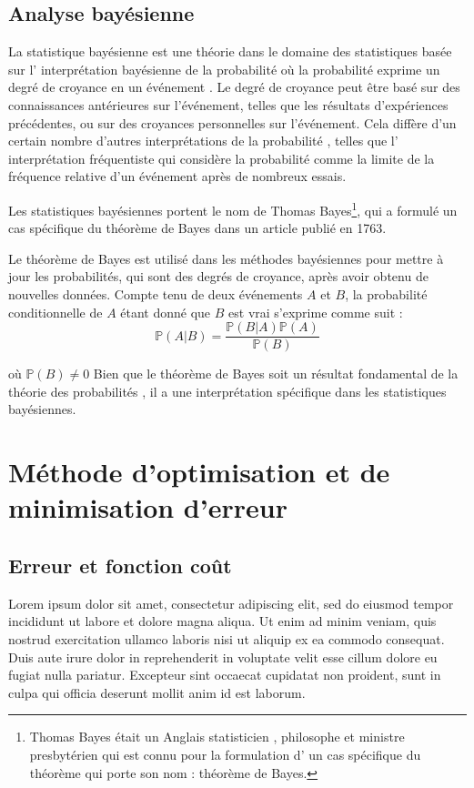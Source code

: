 	\subsection{Analyse bayésienne}
		La statistique bayésienne est une théorie dans le domaine des statistiques basée sur l' interprétation bayésienne de la probabilité où la probabilité exprime un degré de croyance en un événement . Le degré de croyance peut être basé sur des connaissances antérieures sur l'événement, telles que les résultats d'expériences précédentes, ou sur des croyances personnelles sur l'événement. Cela diffère d'un certain nombre d'autres interprétations de la probabilité , telles que l' interprétation fréquentiste qui considère la probabilité comme la limite de la fréquence relative d'un événement après de nombreux essais.
		
		Les statistiques bayésiennes portent le nom de Thomas Bayes\footnote{Thomas Bayes était un Anglais statisticien , philosophe et ministre presbytérien qui est connu pour la formulation d' un cas spécifique du théorème qui porte son nom : théorème de Bayes.}, qui a formulé un cas spécifique du théorème de Bayes dans un article publié en 1763.
		
		
		
		\begin{thm} Le théorème de Bayes est utilisé dans les méthodes bayésiennes pour mettre à jour les probabilités, qui sont des degrés de croyance, après avoir obtenu de nouvelles données. Compte tenu de deux événements $A$  et $B$, la probabilité conditionnelle de $A$ étant donné que $B$ est vrai s'exprime comme suit  :
			\begin{equation}
				\mathbb{P}(A|B) = \frac{\mathbb{P}(B|A) \mathbb{P}(A)}{\mathbb{P}(B)}
			\end{equation}
			
		\end{thm}
	
		où $\mathbb{P}(B) \ne 0$ Bien que le théorème de Bayes soit un résultat fondamental de la théorie des probabilités , il a une interprétation spécifique dans les statistiques bayésiennes.
		
		
		
	\section{Méthode d'optimisation et de minimisation d'erreur}
	\subsection{Erreur et fonction coût}
		Lorem ipsum dolor sit amet, consectetur adipiscing elit, sed do eiusmod tempor incididunt ut labore et dolore magna aliqua. Ut enim ad minim veniam, quis nostrud exercitation ullamco laboris nisi ut aliquip ex ea commodo consequat. Duis aute irure dolor in reprehenderit in voluptate velit esse cillum dolore eu fugiat nulla pariatur. Excepteur sint occaecat cupidatat non proident, sunt in culpa qui officia deserunt mollit anim id est laborum.
